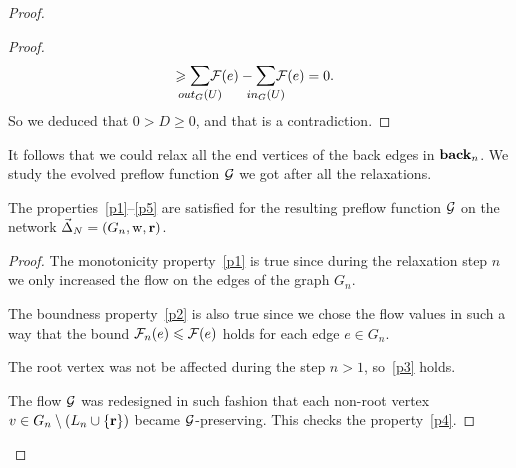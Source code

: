 \documentclass[12pt]{article}
\begin{document}
\begin{proof}
\begin{proof}
\[\begin{split}
          &\geq \mathlarger{\smashoperator{\sum_{\eout_G(U)}}} \flowpos(e) - \mathlarger{\smashoperator{\sum_{\ein_{G}(U)}}} \flowpos(e) = 0.
        \end{split}
      \]
        So we deduced that $0 > D \geq 0$, and that is a contradiction.
      \end{proof}
      It follows that we could relax all the end vertices of the back edges in $\eback_n$.
      We study the evolved preflow function $\cal{G}$ we got after all the relaxations.
      \begin{prop}
        The properties~\ref{p1}--\ref{p5} are satisfied for the resulting preflow function $\cal{G}$ on the network $\onet_N = (G_n, \wtp, \root)$.
      \end{prop}
      \begin{proof}
        The monotonicity property~\ref{p1} is true since during the relaxation step $n$ we
          only increased the flow on the edges of the graph $G_n$.

        The boundness property~\ref{p2} is also true since we chose the flow values in such a way
          that the bound $\flowposn{n}(e) \leq \flowpos(e)$ holds for each edge $e\in G_n$.

        The root vertex was not be affected during the step $n > 1$, so~\ref{p3} holds.

        The flow $\cal{G}$ was redesigned in such fashion that each non-root vertex $v \in G_{n} \setminus 
          \left(L_n \cup \{\root\}\right)$ became $\cal{G}$-preserving.
        This checks the property~\ref{p4}.
        

\end{proof}
\end{proof}
\end{document}
